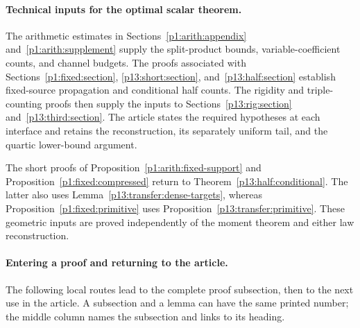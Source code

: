 \paragraph{Technical inputs for the optimal scalar theorem.}
The arithmetic estimates in Sections~\ref{p1:arith:appendix}
and~\ref{p1:arith:supplement} supply the split-product bounds,
variable-coefficient counts, and channel budgets. The proofs
associated with Sections~\ref{p1:fixed:section},
\ref{p13:short:section}, and~\ref{p13:half:section} establish
fixed-source propagation and conditional half counts. The
rigidity and triple-counting proofs then supply the inputs to
Sections~\ref{p13:rig:section} and~\ref{p13:third:section}.
The article states the required hypotheses at each interface
and retains the reconstruction, its separately uniform tail,
and the quartic lower-bound argument.

The short proofs of Proposition~\ref{p1:arith:fixed-support} and
Proposition~\ref{p1:fixed:compressed} return to
Theorem~\ref{p13:half:conditional}. The latter also uses
Lemma~\ref{p13:transfer:dense-targets}, whereas
Proposition~\ref{p1:fixed:primitive} uses
Proposition~\ref{p13:transfer:primitive}. These geometric inputs
are proved independently of the moment theorem and either law reconstruction.

\paragraph{Entering a proof and returning to the article.}
The following local routes lead to the complete proof subsection,
then to the next use in the article. A subsection and a lemma can
have the same printed number; the middle column names the
subsection and links to its heading.

